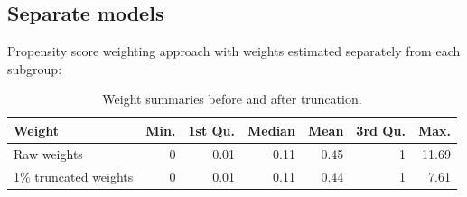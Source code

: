 \documentclass[
  letterpaper,
  DIV=11,
  numbers=noendperiod]{scrreprt}
\newenvironment{Shaded}{\begin{snugshade}}{\end{snugshade}}
\newcommand{\AttributeTok}[1]{\textcolor[rgb]{0.40,0.45,0.13}{#1}}
\newcommand{\ConstantTok}[1]{\textcolor[rgb]{0.56,0.35,0.01}{#1}}
\newcommand{\DecValTok}[1]{\textcolor[rgb]{0.68,0.00,0.00}{#1}}
\newcommand{\FloatTok}[1]{\textcolor[rgb]{0.68,0.00,0.00}{#1}}
\newcommand{\FunctionTok}[1]{\textcolor[rgb]{0.28,0.35,0.67}{#1}}
\newcommand{\NormalTok}[1]{\textcolor[rgb]{0.00,0.23,0.31}{#1}}
\newcommand{\OtherTok}[1]{\textcolor[rgb]{0.00,0.23,0.31}{#1}}
\newcommand{\SpecialCharTok}[1]{\textcolor[rgb]{0.37,0.37,0.37}{#1}}
\newcommand{\StringTok}[1]{\textcolor[rgb]{0.13,0.47,0.30}{#1}}
\begin{document}
\hypertarget{separate-models}{%
\subsection{Separate models}\label{separate-models}}

Propensity score weighting approach with weights estimated separately
from each subgroup:

\begin{Shaded}
\end{Shaded}

\hypertarget{tbl-weight-model2}{}
\begin{table}[!h]
\caption{\label{tbl-weight-model2}Weight summaries before and after truncation. }\tabularnewline

\centering
\begin{tabular}{lrrrrrr}
\toprule
Weight & Min. & 1st Qu. & Median & Mean & 3rd Qu. & Max.\\
\midrule
Raw weights & 0 & 0.01 & 0.11 & 0.45 & 1 & 11.69\\
1\% truncated weights & 0 & 0.01 & 0.11 & 0.44 & 1 & 7.61\\
\bottomrule
\end{tabular}
\end{table}
\end{document}
